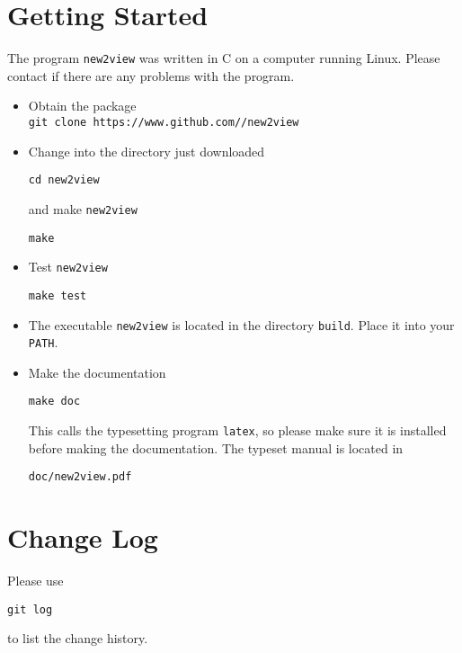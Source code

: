 \documentclass[a4paper, english]{article}
\begin{document}
\section{Getting Started}
The program \texttt{new2view} was written in C on a computer running Linux.
Please contact \texttt{} if there are any problems
with the program.
\begin{itemize}
\item Obtain the package\\
\texttt{git clone https://www.github.com//new2view}
\item Change into the directory just downloaded
\begin{verbatim}
cd new2view
\end{verbatim}
and make \texttt{new2view}
\begin{verbatim}
make
\end{verbatim}
\item Test \texttt{new2view}
\begin{verbatim}
make test
\end{verbatim}
\item The executable \texttt{new2view} is located in the
  directory \texttt{build}. Place it into your \texttt{PATH}.
\item Make the documentation
\begin{verbatim}
make doc
\end{verbatim}
This calls the typesetting program \texttt{latex}, so please make sure
it is installed before making the documentation. The typeset manual is
located in
\begin{verbatim}
doc/new2view.pdf
\end{verbatim}
\end{itemize}

\section{Change Log}
Please use
\begin{verbatim}
git log
\end{verbatim}
to list the change history.

\end{document}
